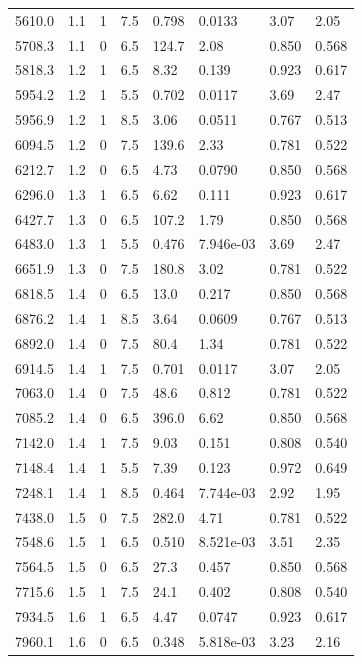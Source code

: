 \documentclass[preview]{standalone}
\begin{document}
{{{\begin{tabular}{L{1.2cm}C{1.2cm} C{0.3cm}C{0.5cm} C{1.4cm}C{1.4cm} C{1.4cm}C{1.4cm}}
  5610.0  &   1.1  & 1     & 7.5 &  0.798  & 0.0133  & 3.07 &  2.05   \\ 
  5708.3  &   1.1  & 0     & 6.5 &  124.7  & 2.08  & 0.850 &  0.568   \\ 
  5818.3  &   1.2  & 1     & 6.5 &  8.32  & 0.139  & 0.923 &  0.617   \\ 
  5954.2  &   1.2  & 1     & 5.5 &  0.702  & 0.0117  & 3.69 &  2.47   \\ 
  5956.9  &   1.2  & 1     & 8.5 &  3.06  & 0.0511  & 0.767 &  0.513   \\ 
  6094.5  &   1.2  & 0     & 7.5 &  139.6  & 2.33  & 0.781 &  0.522   \\ 
  6212.7  &   1.2  & 0     & 6.5 &  4.73  & 0.0790  & 0.850 &  0.568   \\ 
  6296.0  &   1.3  & 1     & 6.5 &  6.62  & 0.111  & 0.923 &  0.617   \\ 
  6427.7  &   1.3  & 0     & 6.5 &  107.2  & 1.79  & 0.850 &  0.568   \\ 
  6483.0  &   1.3  & 1     & 5.5 &  0.476  & 7.946e-03  & 3.69 &  2.47   \\ 
  6651.9  &   1.3  & 0     & 7.5 &  180.8  & 3.02  & 0.781 &  0.522   \\ 
  6818.5  &   1.4  & 0     & 6.5 &  13.0  & 0.217  & 0.850 &  0.568   \\ 
  6876.2  &   1.4  & 1     & 8.5 &  3.64  & 0.0609  & 0.767 &  0.513   \\ 
  6892.0  &   1.4  & 0     & 7.5 &  80.4  & 1.34  & 0.781 &  0.522   \\ 
  6914.5  &   1.4  & 1     & 7.5 &  0.701  & 0.0117  & 3.07 &  2.05   \\ 
  7063.0  &   1.4  & 0     & 7.5 &  48.6  & 0.812  & 0.781 &  0.522   \\ 
  7085.2  &   1.4  & 0     & 6.5 &  396.0  & 6.62  & 0.850 &  0.568   \\ 
  7142.0  &   1.4  & 1     & 7.5 &  9.03  & 0.151  & 0.808 &  0.540   \\ 
  7148.4  &   1.4  & 1     & 5.5 &  7.39  & 0.123  & 0.972 &  0.649   \\ 
  7248.1  &   1.4  & 1     & 8.5 &  0.464  & 7.744e-03  & 2.92 &  1.95   \\ 
  7438.0  &   1.5  & 0     & 7.5 &  282.0  & 4.71  & 0.781 &  0.522   \\ 
  7548.6  &   1.5  & 1     & 6.5 &  0.510  & 8.521e-03  & 3.51 &  2.35   \\ 
  7564.5  &   1.5  & 0     & 6.5 &  27.3  & 0.457  & 0.850 &  0.568   \\ 
  7715.6  &   1.5  & 1     & 7.5 &  24.1  & 0.402  & 0.808 &  0.540   \\ 
  7934.5  &   1.6  & 1     & 6.5 &  4.47  & 0.0747  & 0.923 &  0.617   \\ 
  7960.1  &   1.6  & 0     & 6.5 &  0.348  & 5.818e-03  & 3.23 &  2.16   \\ 
\hline 
\end{tabular} 

}}}
\end{document}

